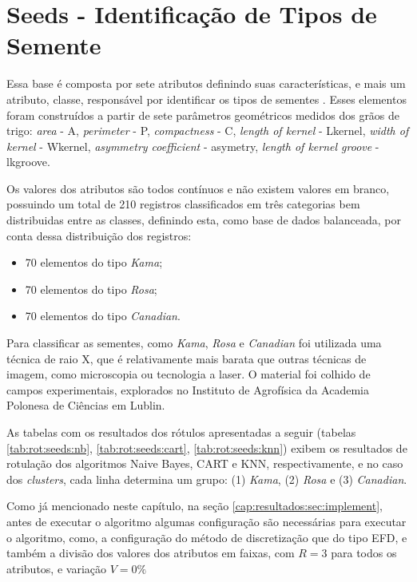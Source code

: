 \section{Seeds - Identificação de Tipos de Semente}
Essa base é composta por sete  atributos definindo suas características, e mais um atributo, classe,  responsável por identificar os tipos de sementes \cite{Charytanowicz2010}. Esses elementos foram construídos a partir de sete parâmetros geométricos medidos dos grãos de trigo: \textit{area} - A, \textit{perimeter} - P, \textit{compactness} - C, \textit{length of kernel} - Lkernel, \textit{width of kernel} - Wkernel, \textit{asymmetry coefficient} - asymetry, \textit{length of kernel groove} - lkgroove.

Os valores dos atributos  são todos contínuos e não existem valores em branco,  possuindo um total de 210 registros classificados em três categorias bem distribuidas entre as classes, definindo esta, como base de dados balanceada, por conta dessa distribuição dos registros:
\begin{itemize}[noitemsep]
 \item 70 elementos do tipo \textit{Kama};
 \item 70 elementos do tipo \textit{Rosa};
 \item 70 elementos do tipo \textit{Canadian}.
\end{itemize}
Para classificar as sementes, como \textit{Kama}, \textit{Rosa} e \textit{Canadian} foi utilizada uma técnica de raio X, que é relativamente mais barata que outras técnicas de imagem, como microscopia ou tecnologia a laser. O material foi colhido de campos experimentais, explorados no Instituto de Agrofísica da Academia Polonesa de Ciências em Lublin.


As tabelas com os resultados dos rótulos apresentadas a seguir (tabelas \ref{tab:rot:seeds:nb}, \ref{tab:rot:seeds:cart}, \ref{tab:rot:seeds:knn}) exibem os resultados de rotulação dos algoritmos Naive Bayes, CART e KNN, respectivamente, e no caso dos \textit{clusters}, cada linha determina um grupo: (1) \textit{Kama}, (2) \textit{Rosa} e (3) \textit{Canadian}. 


Como já mencionado neste capítulo, na seção \ref{cap:resultados:sec:implement}, antes de executar o algoritmo algumas configuração são necessárias para executar o algoritmo, como, a configuração do método de discretização que do tipo EFD, e também a divisão dos valores dos atributos em faixas, com ${R=3}$ para todos os atributos, e variação ${V=0\%}$ 

